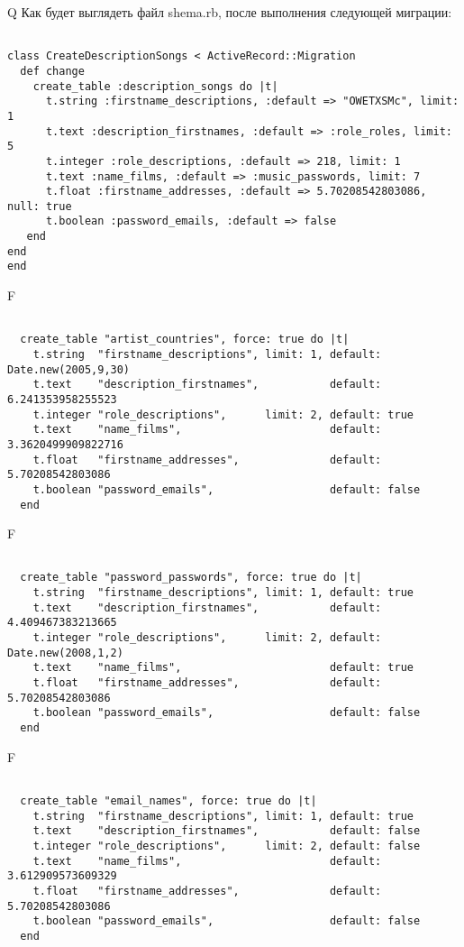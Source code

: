 Q
Как будет выглядеть файл shema.rb, после выполнения следующей миграции:

\begin{verbatim}

class CreateDescriptionSongs < ActiveRecord::Migration 
  def change 
    create_table :description_songs do |t| 
      t.string :firstname_descriptions, :default => "OWETXSMc", limit: 1
      t.text :description_firstnames, :default => :role_roles, limit: 5
      t.integer :role_descriptions, :default => 218, limit: 1
      t.text :name_films, :default => :music_passwords, limit: 7
      t.float :firstname_addresses, :default => 5.70208542803086, null: true
      t.boolean :password_emails, :default => false
   end
end
end
\end{verbatim}

F
\begin{verbatim}

  create_table "artist_countries", force: true do |t|
    t.string  "firstname_descriptions", limit: 1, default: Date.new(2005,9,30)
    t.text    "description_firstnames",           default: 6.241353958255523
    t.integer "role_descriptions",      limit: 2, default: true
    t.text    "name_films",                       default: 3.3620499909822716
    t.float   "firstname_addresses",              default: 5.70208542803086
    t.boolean "password_emails",                  default: false
  end

\end{verbatim}

F
\begin{verbatim}

  create_table "password_passwords", force: true do |t|
    t.string  "firstname_descriptions", limit: 1, default: true
    t.text    "description_firstnames",           default: 4.409467383213665
    t.integer "role_descriptions",      limit: 2, default: Date.new(2008,1,2)
    t.text    "name_films",                       default: true
    t.float   "firstname_addresses",              default: 5.70208542803086
    t.boolean "password_emails",                  default: false
  end

\end{verbatim}

F
\begin{verbatim}

  create_table "email_names", force: true do |t|
    t.string  "firstname_descriptions", limit: 1, default: true
    t.text    "description_firstnames",           default: false
    t.integer "role_descriptions",      limit: 2, default: false
    t.text    "name_films",                       default: 3.612909573609329
    t.float   "firstname_addresses",              default: 5.70208542803086
    t.boolean "password_emails",                  default: false
  end

\end{verbatim}

